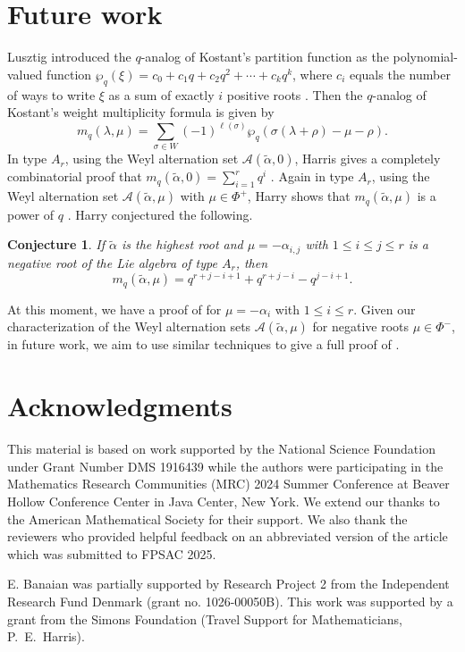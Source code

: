 \documentclass{amsart}
\newtheorem{conjecture}[theorem]{Conjecture}
\theoremstyle{definition}
\newcommand{\hroot}{\tilde{\alpha}}
\newcommand{\calA}{\mathcal{A}}
\begin{document}
\section{Future work}\label{sec:future}
Lusztig introduced the $q$-analog of Kostant's partition function as the polynomial-valued function 
    $\wp_q(\xi)=c_0+c_1q+c_2q^2+\cdots + c_kq^k$,
where $c_i $ equals the number of ways to write $\xi$ as a sum of exactly $i$ positive roots \cite[Proposition 9.2]{Lusztig}.
Then the $q$-analog of Kostant's weight multiplicity formula is given by
     \[m_q(\lambda, \mu)=\sum_{\sigma \in W} (-1)^{\ell(\sigma)}\wp_q(\sigma(\lambda+\rho)-\mu - \rho).\]
In type $A_r$, using the Weyl alternation set $\calA(\hroot,0)$, Harris gives a completely combinatorial proof that $m_q(\hroot,0)=\sum_{i=1}^r q^i$ \cite[Proposition~3.3]{PHThesisPublication}.
Again in type $A_r$, using the Weyl alternation set $\calA(\hroot,\mu)$ with $\mu\in\Phi^+$, Harry shows that $m_q(\hroot,\mu)$ is a power of $q$ \cite[Theorem~4.1]{Harry}.
Harry conjectured the following.
\begin{conjecture}\label{big conjecture}
     If $\hroot$ is the highest root and $\mu=-\alpha_{i,j}$ with $1\leq i\leq j\leq r$
 is a negative root of the Lie algebra of type $A_r$, then
\[m_q(\hroot,\mu)=q^{r+j-i+1}+q^{r+j-i}-q^{j-i+1}.\]
\end{conjecture}
At this moment, we have a proof of  for $\mu=-\alpha_i$ with $1\leq i\leq r$. 
Given our characterization of the Weyl alternation sets $\calA(\hroot,\mu)$ for negative roots $\mu\in\Phi^-$, in future work, we aim to use similar techniques to give a full proof of .


\section*{Acknowledgments}

 This material is based on work supported by the National Science Foundation under Grant Number DMS 1916439 while the authors were participating in the Mathematics Research Communities (MRC) 2024 Summer Conference at Beaver Hollow Conference Center in Java Center, New York. We extend our thanks to the American Mathematical Society for their support. We also thank the reviewers who provided helpful feedback on an abbreviated version of the article which was submitted to FPSAC 2025.
 
 E. Banaian was partially supported by Research Project 2 from the Independent Research Fund
Denmark (grant no. 1026-00050B).
This work was supported by a grant from the Simons Foundation (Travel Support for Mathematicians, P.\ E.\ Harris).
\end{document}

